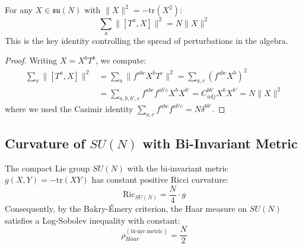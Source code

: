 \begin{lemma}\label{lem:casimir_bound}
For any $X \in \mathfrak{su}(N)$ with $\|X\|^2 = -\text{tr}(X^2)$:
\begin{equation}
    \sum_{a} \|[T^a, X]\|^2 = N \|X\|^2
\end{equation}
This is the key identity controlling the spread of perturbations in the algebra.
\end{lemma}

\begin{proof}
Writing $X = X^b T^b$, we compute:
\begin{align}
    \sum_a \|[T^a, X]\|^2 &= \sum_a \|f^{abc} X^b T^c\|^2 = \sum_{a,c} (f^{abc} X^b)^2 \\
    &= \sum_{a,b,b',c} f^{abc} f^{ab'c} X^b X^{b'} = C_{adj}^{bb'} X^b X^{b'} = N \|X\|^2
\end{align}
where we used the Casimir identity $\sum_{a,c} f^{abc} f^{ab'c} = N \delta^{bb'}$.
\end{proof}

\subsection{Curvature of $SU(N)$ with Bi-Invariant Metric}

\begin{theorem}\label{thm:sun_ricci}
The compact Lie group $SU(N)$ with the bi-invariant metric $g(X,Y) = -\text{tr}(XY)$ has constant positive Ricci curvature:
\begin{equation}
    \text{Ric}_{SU(N)} = \frac{N}{4} \cdot g
\end{equation}
Consequently, by the Bakry-Émery criterion, the Haar measure on $SU(N)$ satisfies a Log-Sobolev inequality with constant:
\begin{equation}
    \rho_{Haar}^{(\mathrm{bi\mbox{-}inv\ metric})} = \frac{N}{2}
\end{equation}
\end{theorem}


